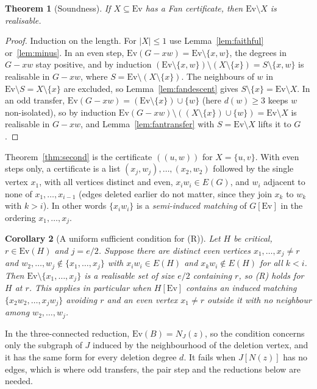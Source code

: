 \documentclass[11pt]{amsart}
\newtheorem{theorem}{Theorem}
\newtheorem{corollary}[theorem]{Corollary}
\theoremstyle{definition}
\newcommand{\Ev}{\mathrm{Ev}}
\begin{document}
\begin{theorem}[Soundness]\label{thm:fancert}
If $X\subseteq\Ev$ has a Fan certificate, then $\Ev\setminus X$ is realisable.
\end{theorem}

\begin{proof}
Induction on the length. For $|X|\le1$ use Lemma~\ref{lem:faithful} or~\ref{lem:minus}. In an even
step, $\Ev(G-xw)=\Ev\setminus\{x,w\}$, the degrees in $G-xw$ stay positive, and by induction
$(\Ev\setminus\{x,w\})\setminus(X\setminus\{x\})=S\setminus\{x,w\}$ is realisable in $G-xw$, where
$S=\Ev\setminus(X\setminus\{x\})$. The neighbours of $w$ in $\Ev\setminus S=X\setminus\{x\}$ are
excluded, so Lemma~\ref{lem:fandescent} gives $S\setminus\{x\}=\Ev\setminus X$. In an odd transfer,
$\Ev(G-xw)=(\Ev\setminus\{x\})\cup\{w\}$ (here $d(w)\ge3$ keeps $w$ non-isolated), so by induction
$\Ev(G-xw)\setminus((X\setminus\{x\})\cup\{w\})=\Ev\setminus X$ is realisable in $G-xw$, and
Lemma~\ref{lem:fantransfer} with $S=\Ev\setminus X$ lifts it to $G$.
\end{proof}

Theorem~\ref{thm:second} is the certificate $((u,w))$ for $X=\{u,v\}$. With even steps only, a
certificate is a list $(x_j,w_j),\dots,(x_2,w_2)$ followed by the single vertex $x_1$, with all
vertices distinct and even, $x_iw_i\in E(G)$, and $w_i$ adjacent to none of $x_1,\dots,x_{i-1}$
(edges deleted earlier do not matter, since they join $x_k$ to $w_k$ with $k>i$). In other words
$\{x_iw_i\}$ is a \emph{semi-induced matching} of $G[\Ev]$ in the ordering
$x_1,\dots,x_j$.

\begin{corollary}[A uniform sufficient condition for (R)]\label{cor:semiinduced}
Let $H$ be critical, $r\in\Ev(H)$ and $j=e/2$. Suppose there are distinct even vertices
$x_1,\dots,x_j\ne r$ and $w_2,\dots,w_j\notin\{x_1,\dots,x_j\}$ with $x_iw_i\in E(H)$ and
$x_kw_i\notin E(H)$ for all $k<i$. Then $\Ev\setminus\{x_1,\dots,x_j\}$ is a realisable set of size
$e/2$ containing $r$, so (R) holds for $H$ at $r$. This applies in particular when $H[\Ev]$
contains an induced matching $\{x_2w_2,\dots,x_jw_j\}$ avoiding $r$ and an even vertex
$x_1\ne r$ outside it with no neighbour among $w_2,\dots,w_j$.
\end{corollary}

In the three-connected reduction, $\Ev(B)=N_J(z)$, so the condition concerns only the subgraph
of $J$ induced by the neighbourhood of the deletion vertex, and it has the same form for every
deletion degree $d$. It fails when $J[N(z)]$ has no edges, which is where odd transfers, the pair
step and the reductions below are needed.
\end{document}
